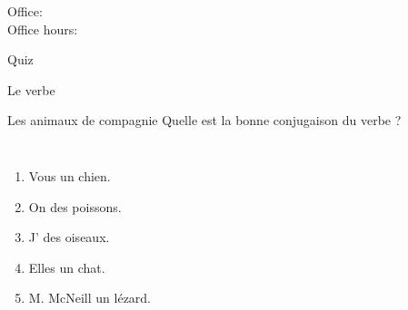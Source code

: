 \documentclass{beamer}
\subtitle[Famille et verbe \lexi{avoir}]{La famille et le verb \lexi{avoir}}
\begin{document}
  \begin{frame}
    \titlepage
    \tiny{Office: \\
          Office hours: }
  \end{frame}

  \begin{frame}{}
    \begin{center}
      \Large Quiz
    \end{center}
  \end{frame}

  \begin{frame}{Le verbe }
    \begin{center}
      
    \end{center}
  \end{frame}

  \begin{frame}{Les animaux de compagnie }
    Quelle est la bonne conjugaison du verbe ? \\
    \begin{columns}
        \begin{enumerate}
          \item Vous \underline{} un chien.
          \item On \underline{} des poissons.
          \item J'\underline{} des oiseaux.
          \item Elles \underline{} un chat.
          \item M. McNeill \underline{} un lézard.
        \end{enumerate}
        \begin{minipage}[c][0.6\textheight]{\linewidth}
          \begin{center}
          \end{center}
        \end{minipage}
    \end{columns}
  \end{frame}
\end{document}
